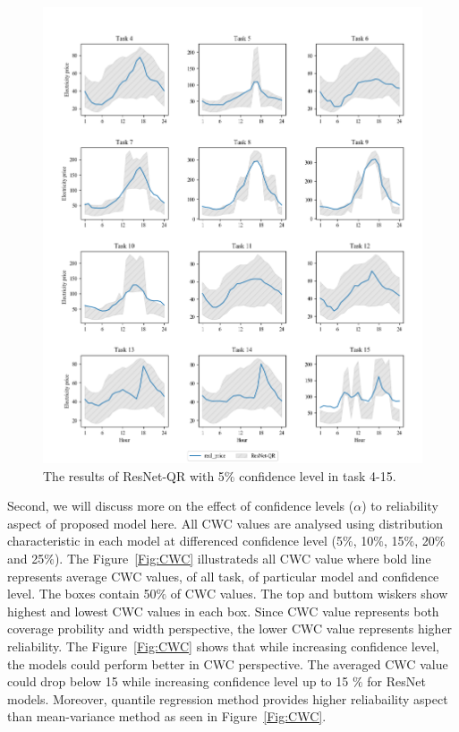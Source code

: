\documentclass[review]{elsarticle}
\begin{document}
    \begin{figure}[H]
      \centering
      \includegraphics[width=15cm]{All_task_with_spike_price_QR_005}
      \caption{The results of ResNet-QR with 5$\%$ confidence level in task 4-15.}
      \label{Fig:all_task_QR_005}
    \end{figure}

    Second, we will discuss more on the effect of confidence levels ($\alpha$) to reliability aspect of proposed model here.
    All CWC values are analysed using distribution characteristic in each model at differenced confidence level (5$\%$, 10$\%$, 15$\%$, 20$\%$ and 25$\%$).
    The Figure~\ref{Fig:CWC} illustrateds all CWC value where bold line represents average CWC values, of all task, of particular model and confidence level.
    The boxes contain 50$\%$ of CWC values.
    The top and buttom wiskers show highest and lowest CWC values in each box.
    Since CWC value represents both coverage probility and width perspective, the lower CWC value represents higher reliability.
    The Figure~\ref{Fig:CWC} shows that while increasing confidence level, the models could perform better in CWC perspective.
    The averaged CWC value could drop below 15 while increasing confidence level up to 15 $\%$ for ResNet models.
    Moreover, quantile regression method provides higher reliabaility aspect than mean-variance method as seen in Figure~\ref{Fig:CWC}.
\end{document}

